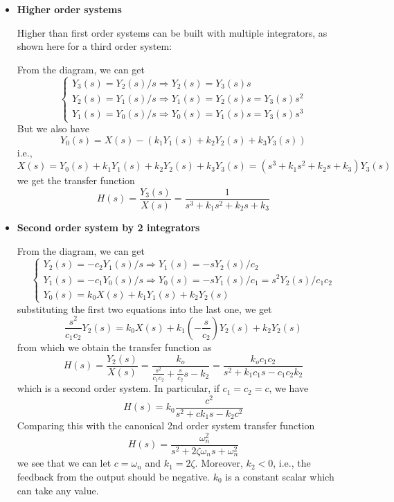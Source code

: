 \begin{itemize}

\item {\bf Higher order systems}

Higher than first order systems can be built with multiple integrators, 
as shown here for a third order system:


From the diagram, we can get
\[
\left\{ \begin{array}{l}
	Y_3(s)=Y_2(s)/s \Longrightarrow Y_2(s)=Y_3(s)s	\\
	Y_2(s)=Y_1(s)/s \Longrightarrow Y_1(s)=Y_2(s)s=Y_3(s)s^2	\\
	Y_1(s)=Y_0(s)/s \Longrightarrow Y_0(s)=Y_1(s)s=Y_3(s)s^3	
\end{array} \right.
\]
But we also have
\[	Y_0(s)=X(s)-(k_1Y_1(s)+k_2Y_2(s)+k_3Y_3(s))	\]
i.e., 
\[	X(s)=Y_0(s)+k_1Y_1(s)+k_2Y_2(s)+k_3Y_3(s)=(s^3+k_1s^2+k_2s+k_3) Y_3(s)	\]
we get the transfer function
\[
	H(s)=\frac{Y_3(s)}{X(s)}=\frac{1}{s^3+k_1s^2+k_2s+k_3}
\]


\item {\bf Second order system by 2 integrators}


From the diagram, we can get
\[
\left\{ \begin{array}{ll}
	Y_2(s)=-c_2Y_1(s)/s  \Longrightarrow  Y_1(s)=-sY_2(s)/c_2 \\
	Y_1(s)=-c_1Y_0(s)/s  \Longrightarrow Y_0(s)=-sY_1(s)/c_1=s^2Y_2(s)/c_1c_2 \\
	Y_0(s)=k_0 X(s)+k_1Y_1(s)+k_2Y_2(s) 
	\end{array} \right.
\]
substituting the first two equations into the last one, we get
\[	\frac{s^2}{c_1c_2} Y_2(s)=k_0X(s)+k_1(-\frac{s}{c_2})Y_2(s)+k_2Y_2(s) \]
from which we obtain the transfer function as
\[
H(s)=\frac{Y_2(s)}{X(s)}=\frac{k_o}{\frac{s^2}{c_1c_2}+\frac{s}{c_2}s-k_2}
	=\frac{k_oc_1c_2}{s^2+k_1c_1s-c_1c_2k_2}
\]
which is a second order system. In particular, if $c_1=c_2=c$, we have
\[
	H(s)=k_0\frac{c^2}{s^2+c k_1s-k_2c^2}
\]
Comparing this with the canonical 2nd order system transfer function
\[
	H(s)=\frac{\omega_n^2}{s^2+2\zeta \omega_n s+\omega_n^2}
\]
we see that we can let $c=\omega_n$ and $k_1=2\zeta$. Moreover, $k_2<0$, 
i.e., the feedback from the output should be negative. $k_0$ is a constant
scalar which can take any value.
	


\end{itemize}
